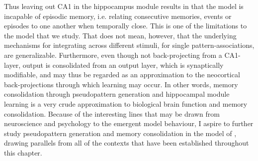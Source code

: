 Thus leaving out CA1 in the hippocampus module results in that the model is incapable of episodic memory, i.e. relating consecutive memories, events or episodes to one another when temporally close. This is one of the limitations to the model that we study. That does not mean, however, that the underlying mechanisms for integrating across different stimuli, for single pattern-associations, are generalizable. Furthermore, even though not back-projecting from a CA1-layer, output is consolidated from an output layer, which is synaptically modifiable, and may thus be regarded as an approximation to the neocortical back-projections through which learning may occur. In other words, memory consolidation through pseudopattern generation and hippocampal module learning is a very crude approximation to biological brain function and memory consolidation. Because of the interesting lines that may be drawn from neuroscience and psychology to the emergent model behaviour, I aspire to further study pseudopattern generation and memory consolidation in the model of \cite{Hattori2014}, drawing parallels from all of the contexts that have been established throughout this chapter.

